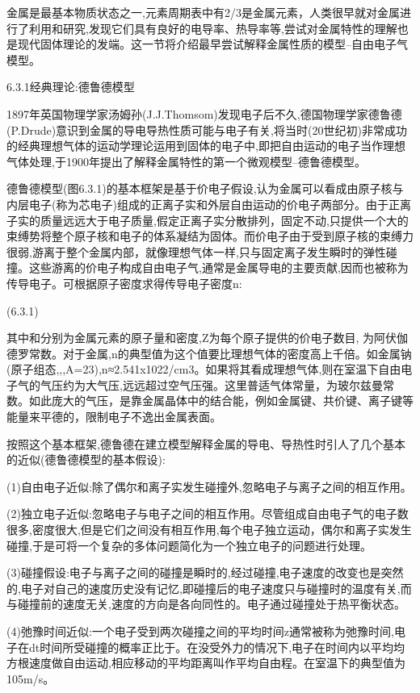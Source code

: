 金属是最基本物质状态之一,元素周期表中有2/3是金属元素，人类很早就对金属进行了利用和研究,发现它们具有良好的电导率、热导率等,尝试对金属特性的理解也是现代固体理论的发端。这一节将介绍最早尝试解释金属性质的模型--自由电子气模型。

6.3.1经典理论:德鲁德模型

1897年英国物理学家汤姆孙(J.J.Thomsom)发现电子后不久,德国物理学家德鲁德(P.Drude)意识到金属的导电导热性质可能与电子有关,将当时(20世纪初)非常成功的经典理想气体的运动学理论运用到固体的电子中,即把自由运动的电子当作理想气体处理,于1900年提出了解释金属特性的第一个微观模型--德鲁德模型。



德鲁德模型(图6.3.1)的基本框架是基于价电子假设,认为金属可以看成由原子核与内层电子(称为芯电子)组成的正离子实和外层自由运动的价电子两部分。由于正离子实的质量远远大于电子质量,假定正离子实分散排列，固定不动,只提供一个大的束缚势将整个原子核和电子的体系凝结为固体。而价电子由于受到原子核的束缚力很弱,游离于整个金属内部，就像理想气体一样,只与固定离子发生瞬时的弹性碰撞。这些游离的价电子构成自由电子气,通常是金属导电的主要贡献,因而也被称为传导电子。可根据原子密度求得传导电子密度n:

 	(6.3.1)

其中和分别为金属元素的原子量和密度,Z为每个原子提供的价电子数目, 为阿伏伽德罗常数。对于金属,n的典型值为这个值要比理想气体的密度高上千倍。如金属钠(原子组态,,,A=23),n≈2.541x1022/cm3。如果将其看成理想气体,则在室温下自由电子气的气压约为大气压,远远超过空气压强。这里普适气体常量，为玻尔兹曼常数。如此庞大的气压，是靠金属晶体中的结合能，例如金属键、共价键、离子键等能量来平德的，限制电子不逸出金属表面。

按照这个基本框架,德鲁德在建立模型解释金属的导电、导热性时引人了几个基本的近似(德鲁德模型的基本假设):

(1)自由电子近似:除了偶尔和离子实发生碰撞外,忽略电子与离子之间的相互作用。

(2)独立电子近似:忽略电子与电子之间的相互作用。尽管组成自由电子气的电子数很多,密度很大,但是它们之间没有相互作用,每个电子独立运动，偶尔和离子实发生碰撞,于是可将一个复杂的多体问题简化为一个独立电子的问题进行处理。

(3)碰撞假设:电子与离子之间的碰撞是瞬时的,经过碰撞,电子速度的改变也是突然的,电子对自己的速度历史没有记忆,即碰撞后的电子速度只与碰撞时的温度有关,而与碰撞前的速度无关,速度的方向是各向同性的。电子通过碰撞处于热平衡状态。

(4)弛豫时间近似:一个电子受到两次碰撞之间的平均时间z通常被称为弛豫时间,电子在dt时间所受碰撞的概率正比于。在没受外力的情况下,电子在时间内以平均均方根速度做自由运动,相应移动的平均距离叫作平均自由程。在室温下的典型值为105m/s。

